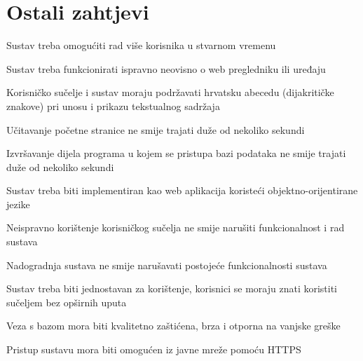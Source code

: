 		\section{Ostali zahtjevi}
		 
			 \begin{packed_item}
			 
			 \item Sustav treba omogućiti rad više korisnika u stvarnom vremenu
			 \item Sustav treba funkcionirati ispravno neovisno o web pregledniku ili uređaju
			 \item Korisničko sučelje i sustav moraju podržavati hrvatsku abecedu (dijakritičke znakove) pri unosu i prikazu tekstualnog sadržaja
			 \item Učitavanje početne stranice ne smije trajati duže od nekoliko sekundi
			 \item Izvršavanje dijela programa u kojem se pristupa bazi podataka ne smije trajati duže od nekoliko sekundi
			 \item Sustav treba biti implementiran kao web aplikacija koristeći objektno-orijentirane jezike
			 \item Neispravno korištenje korisničkog sučelja ne smije narušiti funkcionalnost i rad sustava
			 \item Nadogradnja sustava ne smije narušavati postojeće funkcionalnosti sustava
			 \item Sustav treba biti jednostavan za korištenje, korisnici se moraju znati koristiti sučeljem bez opširnih uputa
			 \item Veza s bazom mora biti kvalitetno zaštićena, brza i otporna na vanjske greške
			 \item Pristup sustavu mora biti omogućen iz javne mreže pomoću HTTPS
			 
			 
			 \end{packed_item}
			 
			 
			 
	